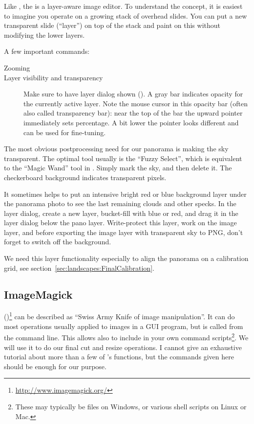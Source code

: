 Like , the  is a layer-aware image
editor. To understand the concept, it is easiest to imagine you
operate on a growing stack of overhead slides. You can put a new
transparent slide (``layer'') on top of the stack and paint on this
without modifying the lower layers.



A few important commands:

\begin{description}
\item[Zooming] 
\item[Layer visibility and transparency] Make sure to have layer
  dialog shown (). A gray bar indicates
  opacity for the currently active layer. Note the mouse cursor in
  this opacity bar (often also called transparency bar): near the top
  of the bar the upward pointer immediately sets percentage. A bit
  lower the pointer looks different and can be used for fine-tuning.
\end{description}


The most obvious postprocessing need for our panorama is making the sky
transparent. The optimal tool usually is the ``Fuzzy Select'', which
is equivalent to the ``Magic Wand'' tool in . Simply mark the
sky, and then delete it. The checkerboard background indicates
transparent pixels.


It sometimes helps to put an intensive bright red or blue background layer under the
panorama photo to see the last remaining clouds and other specks. In the layer dialog,
create a new layer, bucket-fill with blue or red, and drag it in the
layer dialog below the pano layer. Write-protect this layer, work on
the image layer, and before exporting the image layer with transparent
sky to PNG, don't forget to switch off the background.

We need this layer functionality especially to align the panorama on a
calibration grid, see section~\ref{sec:landscapes:FinalCalibration}.





\subsection{ImageMagick}
\label{sec:landscapes:ImageMagick}

()\footnote{\url{http://www.imagemagick.org/}} can be
described as ``Swiss Army Knife of image manipulation''. It can do
most operations usually applied to images in a GUI program, but is
called from the command line. This allows also to include 
in your own command scripts\footnote{These may typically be
   files on Windows, or various shell scripts on Linux or
  Mac.}. We will use it to do our final cut and resize operations. I
cannot give an exhaustive tutorial about more than a few of
's functions, but the commands given here should be enough
for our purpose.

